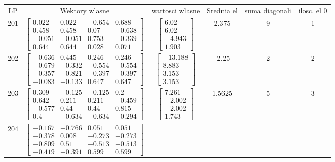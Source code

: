 \documentclass[a4paper,12pt]{article}
\begin{document}
\bgroup {} \vspace{0.2in} \begin{tabular}{c c c c c c}
LP &Wektory wlasne & wartosci wlasne & Srednia el & suma diagonali & ilosc. el 0\\
201
&
$\begin{bmatrix} 0.022 & 0.022 & -0.654 & 0.688 \\ 0.458 & 0.458 & 0.07 & -0.638 \\ -0.051 & -0.051 & 0.753 & -0.339 \\ 0.644 & 0.644 & 0.028 & 0.071 \end{bmatrix}$
&
$\begin{bmatrix} 6.02 \\ 6.02 \\ -4.943 \\ 1.903 \end{bmatrix}$
&
2.375
&
9
&
1
\\
202
&
$\begin{bmatrix} -0.636 & 0.445 & 0.246 & 0.246 \\ -0.679 & -0.332 & -0.554 & -0.554 \\ -0.357 & -0.821 & -0.397 & -0.397 \\ -0.083 & -0.133 & 0.647 & 0.647 \end{bmatrix}$
&
$\begin{bmatrix} -13.188 \\ 8.883 \\ 3.153 \\ 3.153 \end{bmatrix}$
&
-2.25
&
2
&
2
\\
203
&
$\begin{bmatrix} 0.309 & -0.125 & -0.125 & 0.2 \\ 0.642 & 0.211 & 0.211 & -0.459 \\ -0.577 & 0.44 & 0.44 & 0.815 \\ 0.4 & -0.634 & -0.634 & -0.294 \end{bmatrix}$
&
$\begin{bmatrix} 7.261 \\ -2.002 \\ -2.002 \\ 1.743 \end{bmatrix}$
&
1.5625
&
5
&
3
\\
204
&
$\begin{bmatrix} -0.167 & -0.766 & 0.051 & 0.051 \\ -0.378 & 0.008 & -0.273 & -0.273 \\ -0.809 & 0.51 & -0.513 & -0.513 \\ -0.419 & -0.391 & 0.599 & 0.599 \end{bmatrix}$

\end{tabular}
\end{document}
